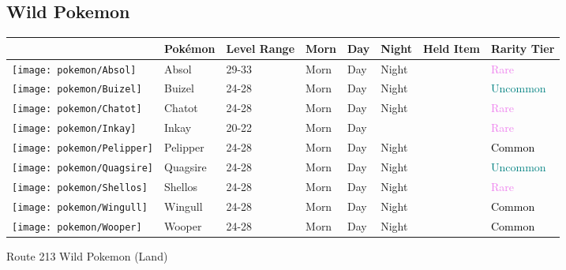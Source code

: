 \subsection{Wild Pokemon}%
\label{subsec:WildPokemon}%
\begin{longtable}{||l l l l l l l l||}%
\hline%
&Pokémon&Level Range&Morn&Day&Night&Held Item&Rarity Tier\\%
\hline%
\endhead%
\hline%
\texttt{[image: pokemon/Absol]}&Absol&29{-}33&Morn&Day&Night&&\textcolor{violet}{%
Rare%
}\\%
\hline%
\texttt{[image: pokemon/Buizel]}&Buizel&24{-}28&Morn&Day&Night&&\textcolor{teal}{%
Uncommon%
}\\%
\hline%
\texttt{[image: pokemon/Chatot]}&Chatot&24{-}28&Morn&Day&Night&&\textcolor{violet}{%
Rare%
}\\%
\hline%
\texttt{[image: pokemon/Inkay]}&Inkay&20{-}22&Morn&Day&&&\textcolor{violet}{%
Rare%
}\\%
\hline%
\texttt{[image: pokemon/Pelipper]}&Pelipper&24{-}28&Morn&Day&Night&&\textcolor{black}{%
Common%
}\\%
\hline%
\texttt{[image: pokemon/Quagsire]}&Quagsire&24{-}28&Morn&Day&Night&&\textcolor{teal}{%
Uncommon%
}\\%
\hline%
\texttt{[image: pokemon/Shellos]}&Shellos&24{-}28&Morn&Day&Night&&\textcolor{violet}{%
Rare%
}\\%
\hline%
\texttt{[image: pokemon/Wingull]}&Wingull&24{-}28&Morn&Day&Night&&\textcolor{black}{%
Common%
}\\%
\hline%
\texttt{[image: pokemon/Wooper]}&Wooper&24{-}28&Morn&Day&Night&&\textcolor{black}{%
Common%
}\\%
\hline%
\end{longtable}%
\caption{Route 213 Wild Pokemon (Land)}%
